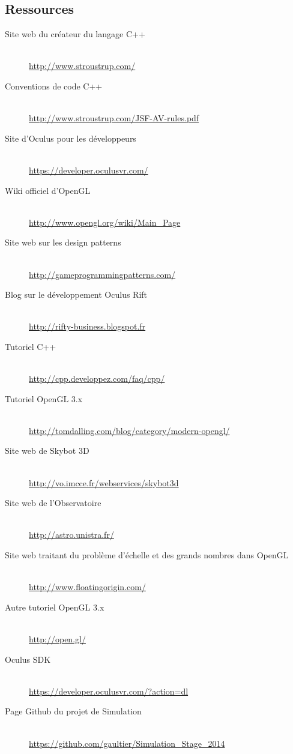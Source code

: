 \documentclass[a4paper,french,12pt]{article}
\begin{document}
	\subsection{Ressources}
	  \begin{description}
	  \item [Site web du créateur du langage C++]~\\
	      \url{http://www.stroustrup.com/}
	  \item [Conventions de code C++]~\\
	      \url{http://www.stroustrup.com/JSF-AV-rules.pdf}
	  \item [Site d'Oculus pour les développeurs]~\\
	      \url{https://developer.oculusvr.com/}
	  \item [Wiki officiel d'OpenGL]~\\
	      \url{http://www.opengl.org/wiki/Main_Page}
	  \item [Site web sur les design patterns]~\\
	      \url{http://gameprogrammingpatterns.com/}
	  \item [Blog sur le développement Oculus Rift]~\\
	      \url{http://rifty-business.blogspot.fr}
	  \item [Tutoriel C++]~\\
	      \url{http://cpp.developpez.com/faq/cpp/}
	  \item [Tutoriel OpenGL 3.x]~\\
	      \url{http://tomdalling.com/blog/category/modern-opengl/}
	  \item [Site web de Skybot 3D]~\\
	      \url{http://vo.imcce.fr/webservices/skybot3d}
	  \item [Site web de l'Observatoire]~\\
	      \url{http://astro.unistra.fr/}
	  \item [Site web traitant du problème d'échelle et des grands nombres dans OpenGL]~\\
	      \url{http://www.floatingorigin.com/}
	  \item [Autre tutoriel OpenGL 3.x]~\\
	      \url{http://open.gl/}
	  \item [Oculus SDK]~\\
	      \url{https://developer.oculusvr.com/?action=dl}
	  \item [Page Github du projet de Simulation]~\\
	    \url{https://github.com/gaultier/Simulation_Stage_2014}
	  \end{description}
\end{document}
